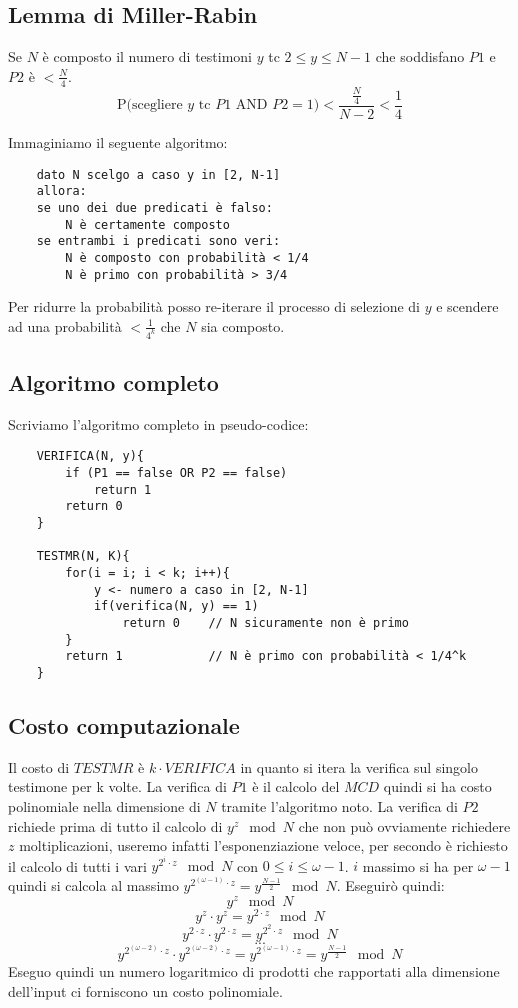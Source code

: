 \subsection{Lemma di Miller-Rabin}
Se $N$ è composto il numero di testimoni $y$ tc $2 \leq y \leq N-1$ che soddisfano $P1$ e $P2$ è $ < \frac{N}{4} $.
$$
    \text{P(scegliere $y$ tc $P1 \text{ AND } P2 = 1$)} < \frac{\frac{N}{4}}{N-2} < \frac{1}{4}
$$

Immaginiamo il seguente algoritmo:
\begin{verbatim}
    dato N scelgo a caso y in [2, N-1]
    allora:
    se uno dei due predicati è falso:
        N è certamente composto
    se entrambi i predicati sono veri:
        N è composto con probabilità < 1/4
        N è primo con probabilità > 3/4
\end{verbatim}

Per ridurre la probabilità posso re-iterare il processo di selezione di $y$ e scendere ad una probabilità
$ < \frac{1}{4^k} $ che $N$ sia composto.

\subsection{Algoritmo completo}
Scriviamo l'algoritmo completo in pseudo-codice:
\begin{verbatim}
    VERIFICA(N, y){
        if (P1 == false OR P2 == false)
            return 1
        return 0
    }
    
    TESTMR(N, K){
        for(i = i; i < k; i++){
            y <- numero a caso in [2, N-1]
            if(verifica(N, y) == 1)
                return 0    // N sicuramente non è primo
        }
        return 1            // N è primo con probabilità < 1/4^k
    }
\end{verbatim}

\subsection{Costo computazionale}
Il costo di $TESTMR$ è $k \cdot VERIFICA$ in quanto si itera la verifica sul singolo testimone per k volte. La verifica di $P1$ è il calcolo del $MCD$ quindi si ha costo polinomiale nella dimensione di $N$ tramite l'algoritmo noto. La verifica di $P2$ richiede prima di tutto il calcolo di $y^z \mod N$ che non può ovviamente richiedere $z$ moltiplicazioni, useremo infatti l'esponenziazione veloce, per secondo è richiesto il calcolo di tutti i vari $y^{2^i \cdot z} \mod N$ con $0 \leq i \leq \omega - 1$. $i$ massimo si ha per $\omega - 1$ quindi si calcola al massimo $y^{2^{(\omega-1)} \cdot z} = y^{\frac{N-1}{2}} \mod N$. Eseguirò quindi:
$$ y^{z} \mod N $$
$$ y^{z} \cdot y^{z} = y^{2 \cdot z} \mod N $$
$$ y^{2 \cdot z} \cdot y^{2 \cdot z} = y^{2^{2} \cdot z} \mod N $$
$$ ... $$
$$ y^{2^{(\omega - 2)} \cdot z} \cdot y^{2^{(\omega - 2)} \cdot z} = y^{2^{(\omega - 1)} \cdot z}  = y^{\frac{N-1}{2}}\mod N $$
Eseguo quindi un numero logaritmico di prodotti che rapportati alla dimensione dell'input ci forniscono un costo polinomiale.

